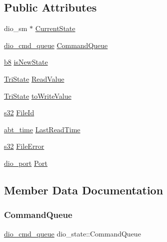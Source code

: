 \subsection*{Public Attributes}
\begin{DoxyCompactItemize}
\item 
dio\+\_\+sm $\ast$ \hyperlink{structdio__state_a3e4d69566fe3663715242717832047ad}{Current\+State}
\item 
\hyperlink{structdio__cmd__queue}{dio\+\_\+cmd\+\_\+queue} \hyperlink{structdio__state_a01f7ae8045204bd943279d573c380620}{Command\+Queue}
\item 
\hyperlink{ab__common_8h_a70e369648385b50f2d0588e8e8745275}{b8} \hyperlink{structdio__state_a6932dd0222d575db057e77a1df47613b}{is\+New\+State}
\item 
\hyperlink{adsio_8h_a20884447391b4598296c73c6fa3d9470}{Tri\+State} \hyperlink{structdio__state_aaa849b5fd1e89616a2a0ad749231f3eb}{Read\+Value}
\item 
\hyperlink{adsio_8h_a20884447391b4598296c73c6fa3d9470}{Tri\+State} \hyperlink{structdio__state_a814fbbc0fd796a5aa5069c5e2da472ad}{to\+Write\+Value}
\item 
\hyperlink{ab__common_8h_ae9b1af5c037e57a98884758875d3a7c4}{s32} \hyperlink{structdio__state_afe0f18233c967a8f31eefe0a1aa7c542}{File\+Id}
\item 
\hyperlink{ab__time_8h_adc59735fd0d20e93fe3016c8b6a4f782}{abt\+\_\+time} \hyperlink{structdio__state_a0646772523d6d065607ca118ffe732cc}{Last\+Read\+Time}
\item 
\hyperlink{ab__common_8h_ae9b1af5c037e57a98884758875d3a7c4}{s32} \hyperlink{structdio__state_aea2fdc28a78a6281357be92204fa5f47}{File\+Error}
\item 
\hyperlink{structdio__port}{dio\+\_\+port} \hyperlink{structdio__state_a9e0dd820a840b52e4696c5f782b0be25}{Port}
\end{DoxyCompactItemize}


\subsection{Member Data Documentation}
\mbox{\label{structdio__state_a01f7ae8045204bd943279d573c380620}} 
\subsubsection{\texorpdfstring{Command\+Queue}{CommandQueue}}
{\footnotesize\ttfamily \hyperlink{structdio__cmd__queue}{dio\+\_\+cmd\+\_\+queue} dio\+\_\+state\+::\+Command\+Queue}

